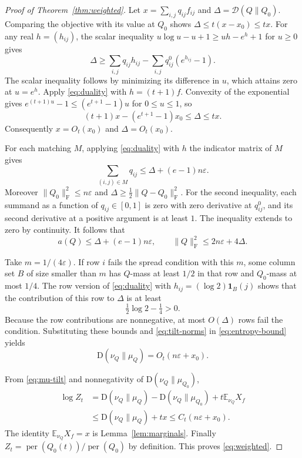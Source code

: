 \documentclass[11pt]{article}
\DeclareMathOperator{\per}{per}
\newcommand{\E}{\mathbb{E}}
\newcommand{\one}{\mathbf{1}}
\newcommand{\KL}{\mathrm{D}}
\newcommand{\Frob}{\mathrm{F}}
\begin{document}
\begin{proof}[Proof of Theorem~\ref{thm:weighted}]
Let \(x=\sum_{i,j}q_{ij}f_{ij}\) and \(\Delta=\mathcal D(Q\|Q_0)\). Comparing the objective with its value at \(Q_0\) shows \(\Delta\le t(x-x_0)\le tx\). For any real \(h=(h_{ij})\), the scalar inequality \(u\log u-u+1\ge uh-e^h+1\) for \(u\ge0\) gives
\begin{equation}\label{eq:duality}
 \Delta\ge\sum_{i,j}q_{ij}h_{ij}-\sum_{i,j}q^0_{ij}(e^{h_{ij}}-1).
\end{equation}
The scalar inequality follows by minimizing its difference in \(u\), which attains zero at \(u=e^h\). Apply \eqref{eq:duality} with \(h=(t+1)f\). Convexity of the exponential gives \(e^{(t+1)u}-1\le(e^{t+1}-1)u\) for \(0\le u\le1\), so
\[
 (t+1)x-(e^{t+1}-1)x_0\le\Delta\le tx .
\]
Consequently \(x=O_t(x_0)\) and \(\Delta=O_t(x_0)\).

For each matching \(M\), applying \eqref{eq:duality} with \(h\) the indicator matrix of \(M\) gives
\[
 \sum_{(i,j)\in M}q_{ij}\le \Delta+(e-1)n\varepsilon.
\]
Moreover \(\|Q_0\|_{\Frob}^2\le n\varepsilon\) and \(\Delta\ge \tfrac12\|Q-Q_0\|_{\Frob}^2\). For the second inequality, each summand as a function of \(q_{ij}\in[0,1]\) is zero with zero derivative at \(q^0_{ij}\), and its second derivative at a positive argument is at least \(1\). The inequality extends to zero by continuity. It follows that
\begin{equation}\label{eq:tilt-norms}
 a(Q)\le \Delta+(e-1)n\varepsilon,\qquad
 \|Q\|_{\Frob}^2\le 2n\varepsilon+4\Delta .
\end{equation}

Take \(m=1/(4\varepsilon)\). If row \(i\) fails the spread condition with this \(m\), some column set \(B\) of size smaller than \(m\) has \(Q\)-mass at least \(1/2\) in that row and \(Q_0\)-mass at most \(1/4\). The row version of \eqref{eq:duality} with \(h_{ij}=(\log 2)\one_B(j)\) shows that the contribution of this row to \(\Delta\) is at least
\[
 \tfrac12\log 2-\tfrac14>0.
\]
Because the row contributions are nonnegative, at most \(O(\Delta)\) rows fail the condition. Substituting these bounds and \eqref{eq:tilt-norms} in \eqref{eq:entropy-bound} yields
\[
 \KL(\nu_Q\|\mu_Q)=O_t(n\varepsilon+x_0).
\]

From \eqref{eq:mu-tilt} and nonnegativity of \(\KL(\nu_Q\|\mu_{Q_0})\),
\begin{align*}
 \log Z_t
 &=\KL(\nu_Q\|\mu_Q)-\KL(\nu_Q\|\mu_{Q_0})+t\E_{\nu_Q}X_f\\
 &\le\KL(\nu_Q\|\mu_Q)+tx
 \le C_t(n\varepsilon+x_0).
\end{align*}
The identity \(\E_{\nu_Q}X_f=x\) is Lemma~\ref{lem:marginals}. Finally \(Z_t=\per(Q_0(t))/\per(Q_0)\) by definition. This proves \eqref{eq:weighted}.
\end{proof}
\end{document}
